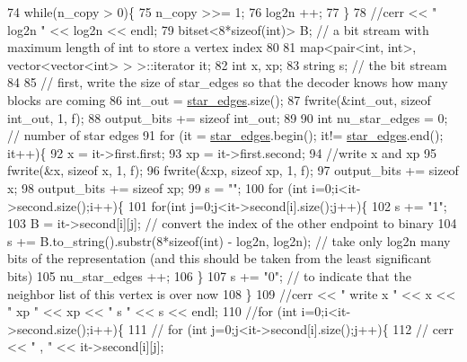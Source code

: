 \begin{DoxyCode}
74   \textcolor{keywordflow}{while}(n\_copy > 0)\{
75     n\_copy >>= 1;
76     log2n ++;
77   \}
78   \textcolor{comment}{//cerr << " log2n " << log2n << endl;}
79   bitset<8*sizeof(int)> B; \textcolor{comment}{// a bit stream with maximum length of int to store a vertex index}
80 
81   map<pair<int, int>, vector<vector<int> > >::iterator it;
82   \textcolor{keywordtype}{int} x, xp;
83   \textcolor{keywordtype}{string} s; \textcolor{comment}{// the bit stream}
84 
85   \textcolor{comment}{// first, write the size of star\_edges so that the decoder knows how many blocks are coming}
86   int\_out = \hyperlink{classmarked__graph__compressed_a7df5779d313486644132bd816937f532}{star\_edges}.size();
87   fwrite(&int\_out, \textcolor{keyword}{sizeof} int\_out, 1, f);
88   output\_bits += \textcolor{keyword}{sizeof} int\_out;
89 
90   \textcolor{keywordtype}{int} nu\_star\_edges = 0; \textcolor{comment}{// number of star edges }
91   \textcolor{keywordflow}{for} (it = \hyperlink{classmarked__graph__compressed_a7df5779d313486644132bd816937f532}{star\_edges}.begin(); it!= \hyperlink{classmarked__graph__compressed_a7df5779d313486644132bd816937f532}{star\_edges}.end(); it++)\{
92     x = it->first.first;
93     xp = it->first.second;
94     \textcolor{comment}{//write x and xp}
95     fwrite(&x, \textcolor{keyword}{sizeof} x, 1, f);
96     fwrite(&xp, \textcolor{keyword}{sizeof} xp, 1, f);
97     output\_bits += \textcolor{keyword}{sizeof} x;
98     output\_bits += \textcolor{keyword}{sizeof} xp;
99     s = \textcolor{stringliteral}{""};
100     \textcolor{keywordflow}{for} (\textcolor{keywordtype}{int} i=0;i<it->second.size();i++)\{
101       \textcolor{keywordflow}{for}(\textcolor{keywordtype}{int} j=0;j<it->second[i].size();j++)\{
102         s += \textcolor{stringliteral}{"1"};
103         B = it->second[i][j]; \textcolor{comment}{// convert the index of the other endpoint to binary}
104         s += B.to\_string().substr(8*\textcolor{keyword}{sizeof}(\textcolor{keywordtype}{int}) - log2n, log2n); \textcolor{comment}{// take only log2n many bits of the
       representation (and this should be taken from the least significant bits)}
105         nu\_star\_edges ++;
106       \}
107       s += \textcolor{stringliteral}{"0"}; \textcolor{comment}{// to indicate that the neighbor list of this vertex is over now}
108     \}
109     \textcolor{comment}{//cerr << " write  x " << x << " xp " << xp << " s " << s << endl;}
110     \textcolor{comment}{//for (int i=0;i<it->second.size();i++)\{}
111     \textcolor{comment}{//  for (int j=0;j<it->second[i].size();j++)\{}
112     \textcolor{comment}{//    cerr << " , " << it->second[i][j];}

\end{DoxyCode}
